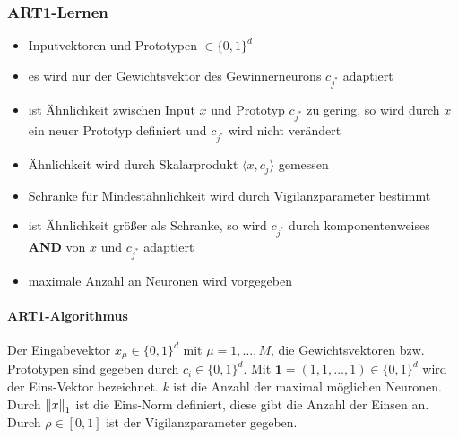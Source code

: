 \subsubsection{ART1-Lernen}
\begin{itemize}
    \item Inputvektoren und Prototypen $\in\{0,1\}^d$
    \item es wird nur der Gewichtsvektor des Gewinnerneurons $c_{j^*}$ adaptiert
    \item ist Ähnlichkeit zwischen Input $x$ und Prototyp $c_{j^*}$ zu gering, so wird durch $x$ ein neuer Prototyp definiert und $c_{j^*}$ wird nicht verändert
    \item Ähnlichkeit wird durch Skalarprodukt $\langle x,c_j \rangle$ gemessen
    \item Schranke für Mindestähnlichkeit wird durch Vigilanzparameter bestimmt
    \item ist Ähnlichkeit größer als Schranke, so wird $c_{j^*}$ durch komponentenweises \textbf{AND} von $x$ und $c_{j^*}$ adaptiert
    \item maximale Anzahl an Neuronen wird vorgegeben
\end{itemize}

\paragraph{ART1-Algorithmus}
Der Eingabevektor $x_\mu \in \{ 0,1 \}^d$ mit $\mu=1,\dots,M$, die Gewichtsvektoren bzw. Prototypen sind gegeben durch $c_i\in \{ 0,1 \}^d$. Mit $\textbf{1} = (1,1,\dots,1)\in \{ 0,1 \}^d$ wird der Eins-Vektor bezeichnet. $k$ ist die Anzahl der maximal möglichen Neuronen. Durch $\left\lVert x\right\rVert_1$ ist die Eins-Norm definiert, diese gibt die Anzahl der Einsen an. Durch $\rho\in[0,1]$ ist der Vigilanzparameter gegeben.\\

